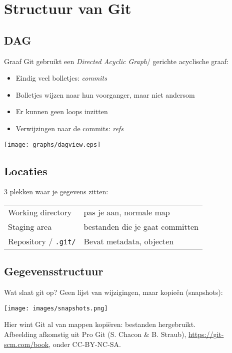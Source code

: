 \section[Structuur]{Structuur van Git}
\subsection{DAG}
\begin{frame}{Graaf}
	Git gebruikt een \emph{Directed Acyclic Graph}/ gerichte acyclische graaf:
	\begin{itemize}
		\item Eindig veel bolletjes: \emph{commits}
		\item Bolletjes wijzen naar hun voorganger, maar niet andersom
		\item Er kunnen geen loops inzitten
		\item Verwijzingen naar de commits: \emph{refs}
	\end{itemize}

	\begin{center}
		\texttt{[image: graphs/dagview.eps]}
	\end{center}
\end{frame}

\subsection{Locaties}
\begin{frame}
	3 plekken waar je gegevens zitten:\\
	\vspace{.5cm}
	\begin{tabular}{ll}
		 Working directory			& pas je aan, normale map\\
		 Staging area				& bestanden die je gaat committen\\
		 Repository / \texttt{.git/}&Bevat metadata, objecten
	\end{tabular}
\end{frame}

\subsection{Gegevensstructuur}
\begin{frame}{Wat slaat git op?}
	Geen lijst van wijzigingen, maar kopie\"en (snapshots):
	\begin{center}
		\texttt{[image: images/snapshots.png]}
	\end{center}
	{\footnotesize Hier wint Git al van mappen kopi\"eren: bestanden hergebruikt. } \\
	{\tiny Afbeelding afkomstig uit Pro Git (S. Chacon \& B. Straub), \url{https://git-scm.com/book}, onder CC-BY-NC-SA.}
\end{frame}


